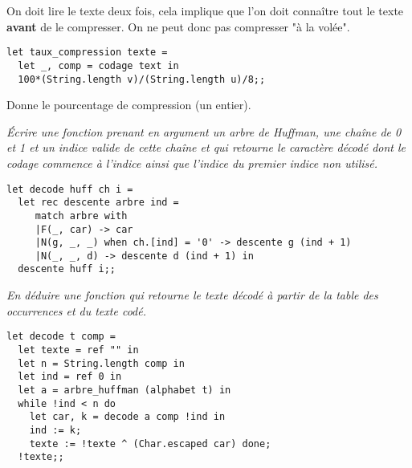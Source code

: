 \begin{Answer}
On doit lire le texte deux fois, cela implique que l'on doit connaître tout le texte {\bf avant} de le compresser. On ne peut donc pas compresser "à la volée".
\begin{lstlisting}
let taux_compression texte = 
  let _, comp = codage text in
  100*(String.length v)/(String.length u)/8;;
\end{lstlisting}
Donne le pourcentage de compression (un entier).
\end{Answer}
\begin{Exercise}[title = Décodage d'une lettre]\it 
Écrire une fonction prenant en argument un arbre de Huffman, une chaîne de 0 et 1 et un indice valide de cette chaîne et qui retourne le caractère décodé dont le codage commence à l'indice ainsi que l'indice du premier indice non utilisé.
\end{Exercise}
\begin{Answer}
\begin{lstlisting}
let decode huff ch i =
  let rec descente arbre ind =
     match arbre with
     |F(_, car) -> car
     |N(g, _, _) when ch.[ind] = '0' -> descente g (ind + 1)
     |N(_, _, d) -> descente d (ind + 1) in
  descente huff i;;
\end{lstlisting}
\end{Answer}
\begin{Exercise}[title = Décodage]\it 
En déduire une fonction  qui retourne le texte décodé à partir de la table des occurrences et du texte codé.

\end{Exercise}
\begin{Answer}
\begin{lstlisting}
let decode t comp = 
  let texte = ref "" in
  let n = String.length comp in
  let ind = ref 0 in
  let a = arbre_huffman (alphabet t) in
  while !ind < n do
    let car, k = decode a comp !ind in
    ind := k;
    texte := !texte ^ (Char.escaped car) done;
  !texte;;
\end{lstlisting}
\end{Answer}

